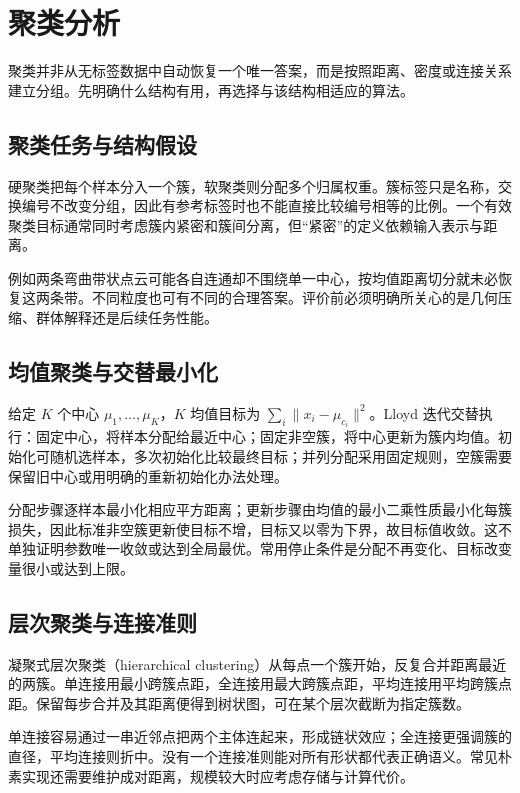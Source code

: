\setcounter{chapter}{13} %
\chapter{聚类分析}
\label{chap:ml-clustering}

聚类并非从无标签数据中自动恢复一个唯一答案，而是按照距离、密度或连接关系建立分组。先明确什么结构有用，再选择与该结构相适应的算法。

\section{聚类任务与结构假设}

硬聚类把每个样本分入一个簇，软聚类则分配多个归属权重。簇标签只是名称，交换编号不改变分组，因此有参考标签时也不能直接比较编号相等的比例。一个有效聚类目标通常同时考虑簇内紧密和簇间分离，但“紧密”的定义依赖输入表示与距离。

例如两条弯曲带状点云可能各自连通却不围绕单一中心，按均值距离切分就未必恢复这两条带。不同粒度也可有不同的合理答案。评价前必须明确所关心的是几何压缩、群体解释还是后续任务性能。

\section{均值聚类与交替最小化}

给定 $K$ 个中心 $\mu_1,\ldots,\mu_K$，$K$ 均值目标为 $\sum_i\|x_i-\mu_{c_i}\|^2$。Lloyd 迭代交替执行：固定中心，将样本分配给最近中心；固定非空簇，将中心更新为簇内均值。初始化可随机选样本，多次初始化比较最终目标；并列分配采用固定规则，空簇需要保留旧中心或用明确的重新初始化办法处理。

分配步骤逐样本最小化相应平方距离；更新步骤由均值的最小二乘性质最小化每簇损失，因此标准非空簇更新使目标不增，目标又以零为下界，故目标值收敛。这不单独证明参数唯一收敛或达到全局最优。常用停止条件是分配不再变化、目标改变量很小或达到上限。

\section{层次聚类与连接准则}

凝聚式层次聚类（hierarchical clustering）从每点一个簇开始，反复合并距离最近的两簇。单连接用最小跨簇点距，全连接用最大跨簇点距，平均连接用平均跨簇点距。保留每步合并及其距离便得到树状图，可在某个层次截断为指定簇数。

单连接容易通过一串近邻点把两个主体连起来，形成链状效应；全连接更强调簇的直径，平均连接则折中。没有一个连接准则能对所有形状都代表正确语义。常见朴素实现还需要维护成对距离，规模较大时应考虑存储与计算代价。

